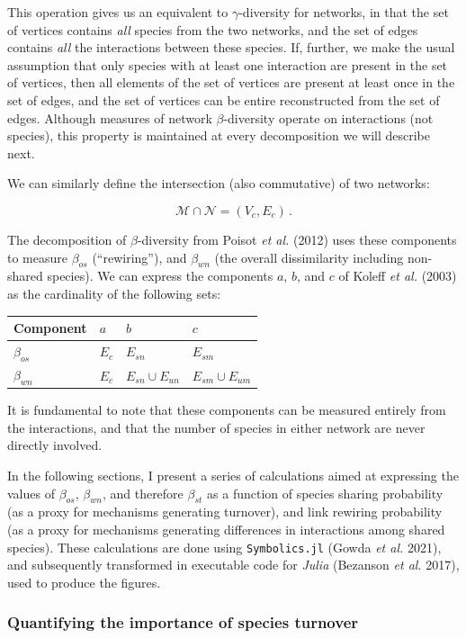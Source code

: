 \documentclass[11pt]{article}
\begin{document}
This operation gives us an equivalent to \(\gamma\)-diversity for
networks, in that the set of vertices contains \emph{all} species from
the two networks, and the set of edges contains \emph{all} the
interactions between these species. If, further, we make the usual
assumption that only species with at least one interaction are present
in the set of vertices, then all elements of the set of vertices are
present at least once in the set of edges, and the set of vertices can
be entire reconstructed from the set of edges. Although measures of
network \(\beta\)-diversity operate on interactions (not species), this
property is maintained at every decomposition we will describe next.

We can similarly define the intersection (also commutative) of two
networks:

\[\mathcal{M} \cap \mathcal{N} = (V_c, E_c)\,.\]

The decomposition of \(\beta\)-diversity from Poisot \emph{et al.}
(2012) uses these components to measure \(\beta_{os}\) (``rewiring''),
and \(\beta_{wn}\) (the overall dissimilarity including non-shared
species). We can express the components \(a\), \(b\), and \(c\) of
Koleff \emph{et al.} (2003) as the cardinality of the following sets:

\begin{longtable}[]{@{}llll@{}}
\toprule
Component & \(a\) & \(b\) & \(c\)\tabularnewline
\midrule
\endhead
\(\beta_{os}\) & \(E_c\) & \(E_{sn}\) & \(E_{sm}\)\tabularnewline
\(\beta_{wn}\) & \(E_c\) & \(E_{sn} \cup E_{un}\) &
\(E_{sm} \cup E_{um}\)\tabularnewline
\bottomrule
\end{longtable}

It is fundamental to note that these components can be measured entirely
from the interactions, and that the number of species in either network
are never directly involved.

In the following sections, I present a series of calculations aimed at
expressing the values of \(\beta_{os}\), \(\beta_{wn}\), and therefore
\(\beta_{st}\) as a function of species sharing probability (as a proxy
for mechanisms generating turnover), and link rewiring probability (as a
proxy for mechanisms generating differences in interactions among shared
species). These calculations are done using \texttt{Symbolics.jl} (Gowda
\emph{et al.} 2021), and subsequently transformed in executable code for
\emph{Julia} (Bezanson \emph{et al.} 2017), used to produce the figures.

\hypertarget{quantifying-the-importance-of-species-turnover}{%
\subsubsection{Quantifying the importance of species
turnover}\label{quantifying-the-importance-of-species-turnover}}
\end{document}

